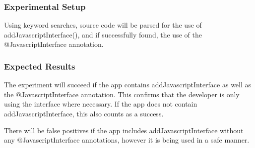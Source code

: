 \documentclass[10pt,twocolumn,pdftex]{article}
\begin{document}
    \subsubsection{Experimental Setup}
    Using keyword searches, source code will be parsed for the use of addJavascriptInterface(), and if successfully found, the use of the @JavascriptInterface annotation.

    \subsubsection{Expected Results}
    The experiment will succeed if the app contains addJavascriptInterface as well as the @JavascriptInterface annotation. This confirms that the developer is only using the interface where necessary. If the app does not contain addJavascriptInterface, this also counts as a success.

    There will be false positives if the app includes addJavascriptInterface without any @JavascriptInterface annotations, however it is being used in a safe manner.
    
    


\cite{10.1145/2382196.2382205}
\cite{10.1145/3086467.3086469}
\end{document}
